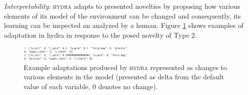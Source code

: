 \documentclass[letterpaper]{article} %
\begin{document}
\emph{Interpretability}: \textsc{hydra} adapts to presented novelties by proposing how various elements of its model of the environment can be changed and consequently, its learning can be inspected an analyzed by a human. Figure \ref{fig:example} shows examples of adaptation in hydra in response to the posed novelty of Type 2. 

\begin{figure}
    \centering
    \includegraphics[width=0.5\textwidth]{figures/experiments/inspectable.png}
    \caption{Example adaptations produced by \textsc{hydra} represented as changes to various elements in the model (presented as delta from the default value of each variable, 0 denotes no change).}
    \label{fig:example}
\end{figure}










\end{document}
